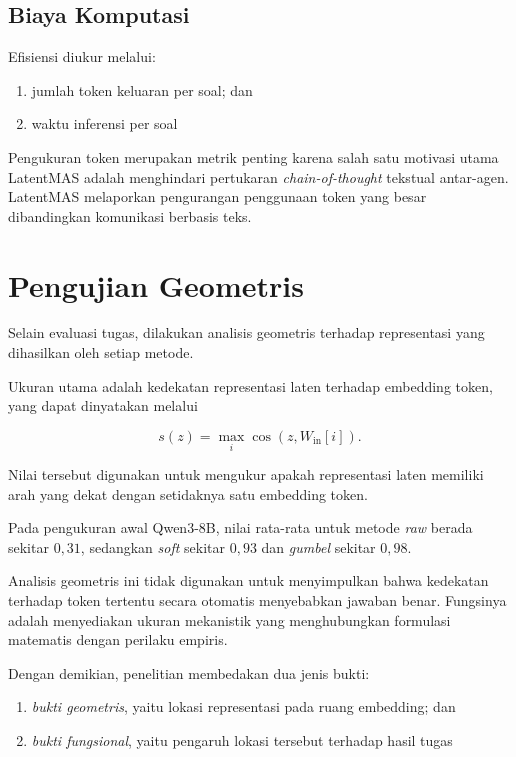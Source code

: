\subsection{Biaya Komputasi}

Efisiensi diukur melalui:

\begin{enumerate}
    \item jumlah token keluaran per soal; dan
    \item waktu inferensi per soal
\end{enumerate}

Pengukuran token merupakan metrik penting karena salah satu motivasi utama LatentMAS adalah menghindari pertukaran \textit{chain-of-thought} tekstual antar-agen. LatentMAS melaporkan pengurangan penggunaan token yang besar dibandingkan komunikasi berbasis teks.

\section{Pengujian Geometris}

Selain evaluasi tugas, dilakukan analisis geometris terhadap representasi yang dihasilkan oleh setiap metode.

Ukuran utama adalah kedekatan representasi laten terhadap embedding token, yang dapat dinyatakan melalui

\begin{equation}
s(z)
=
\max_i
\cos
\left(
z,W_{\mathrm{in}}[i]
\right).
\end{equation}

Nilai tersebut digunakan untuk mengukur apakah representasi laten memiliki arah yang dekat dengan setidaknya satu embedding token.

Pada pengukuran awal Qwen3-8B, nilai rata-rata untuk metode \textit{raw} berada sekitar \(0{,}31\), sedangkan \textit{soft} sekitar \(0{,}93\) dan \textit{gumbel} sekitar \(0{,}98\).

Analisis geometris ini tidak digunakan untuk menyimpulkan bahwa kedekatan terhadap token tertentu secara otomatis menyebabkan jawaban benar. Fungsinya adalah menyediakan ukuran mekanistik yang menghubungkan formulasi matematis dengan perilaku empiris.

Dengan demikian, penelitian membedakan dua jenis bukti:

\begin{enumerate}
    \item \textit{bukti geometris}, yaitu lokasi representasi pada ruang embedding; dan
    \item \textit{bukti fungsional}, yaitu pengaruh lokasi tersebut terhadap hasil tugas
\end{enumerate}

